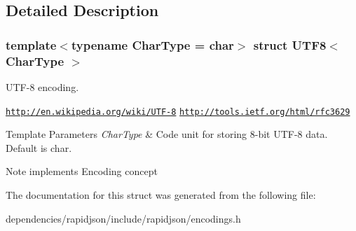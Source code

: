 \subsection{Detailed Description}
\subsubsection*{template$<$typename Char\+Type = char$>$\newline
struct U\+T\+F8$<$ Char\+Type $>$}

U\+T\+F-\/8 encoding. 

\href{http://en.wikipedia.org/wiki/UTF-8}{\tt http\+://en.\+wikipedia.\+org/wiki/\+U\+T\+F-\/8} \href{http://tools.ietf.org/html/rfc3629}{\tt http\+://tools.\+ietf.\+org/html/rfc3629} 
\begin{DoxyTemplParams}{Template Parameters}
{\em Char\+Type} & Code unit for storing 8-\/bit U\+T\+F-\/8 data. Default is char. \\
\hline
\end{DoxyTemplParams}
\begin{DoxyNote}{Note}
implements Encoding concept 
\end{DoxyNote}


The documentation for this struct was generated from the following file\+:\begin{DoxyCompactItemize}
\item 
dependencies/rapidjson/include/rapidjson/encodings.\+h\end{DoxyCompactItemize}
